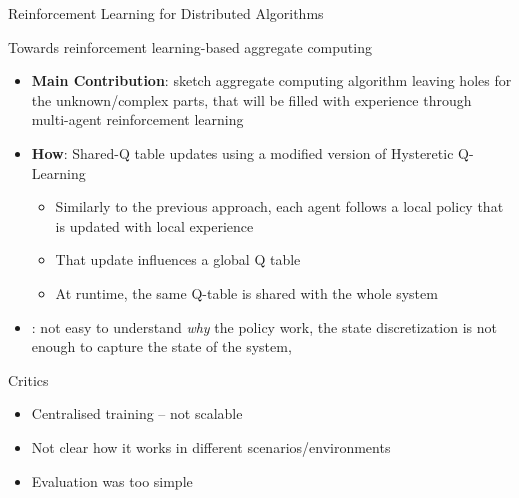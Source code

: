 \documentclass[presentation, 9pt]{beamer}\mode<presentation>{\usetheme{AMSBolognaFC}}
\begin{document}
\begin{frame}{Reinforcement Learning for Distributed Algorithms}
\begin{alertblock}{Towards reinforcement learning-based aggregate computing}
	\begin{itemize}
		\item \textbf{Main Contribution}: sketch aggregate computing algorithm leaving holes for the unknown/complex parts, that will be filled with experience through multi-agent reinforcement learning
		\item \textbf{How}: Shared-Q table updates using a modified version of Hysteretic Q-Learning
		\begin{itemize}
			\item Similarly to the previous approach, each agent follows a local policy that is updated with local experience
			\item That update influences a global Q table
			\item At runtime, the same Q-table is shared with the whole system
		\end{itemize}
		\item {}: not easy to understand \emph{why} the policy work, the state discretization is not enough to capture the state of the system, 
	\end{itemize}
\end{alertblock}
\begin{block}{Critics}
\begin{itemize}
	\item Centralised training -- not scalable
	\item Not clear how it works in different scenarios/environments
	\item Evaluation was too simple
\end{itemize}
\end{block}
\end{frame}
\end{document}
